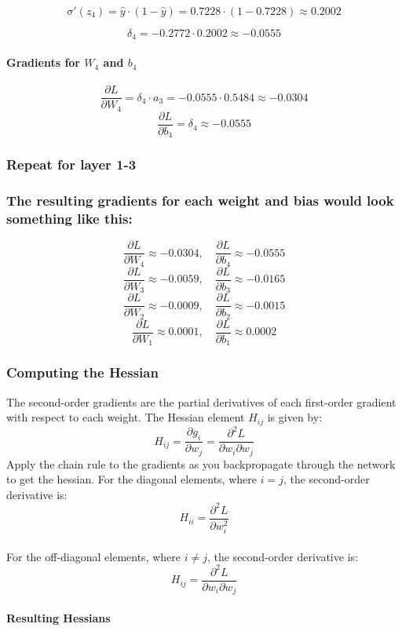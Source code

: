 \documentclass{article}
\begin{document}
\[
\sigma'(z_4) = \hat{y} \cdot (1 - \hat{y}) = 0.7228 \cdot (1 - 0.7228) \approx 0.2002
\]

\[
\delta_4 = -0.2772 \cdot 0.2002 \approx -0.0555
\]

\paragraph{Gradients for \( W_4 \) and \( b_4 \)}
\[
\frac{\partial L}{\partial W_4} = \delta_4 \cdot a_3 = -0.0555 \cdot 0.5484 \approx -0.0304
\]
\[
\frac{\partial L}{\partial b_4} = \delta_4 \approx -0.0555
\]


\subsubsection{Repeat for layer 1-3}

\subsubsection{The resulting gradients for each weight and bias would look something like this:}
\[
\frac{\partial L}{\partial W_4} \approx -0.0304, \quad \frac{\partial L}{\partial b_4} \approx -0.0555
\]
\[
\frac{\partial L}{\partial W_3} \approx -0.0059, \quad \frac{\partial L}{\partial b_3} \approx -0.0165
\]
\[
\frac{\partial L}{\partial W_2} \approx -0.0009, \quad \frac{\partial L}{\partial b_2} \approx -0.0015
\]
\[
\frac{\partial L}{\partial W_1} \approx 0.0001, \quad \frac{\partial L}{\partial b_1} \approx 0.0002
\]

\subsubsection{Computing the Hessian}

The second-order gradients are the partial derivatives of each first-order gradient with respect to each weight. The Hessian element \( H_{ij} \) is given by:
\[
H_{ij} = \frac{\partial g_i}{\partial w_j} = \frac{\partial^2 L}{\partial w_i \partial w_j}
\]
Apply the chain rule to the gradients as you backpropagate through the network to get the hessian. For the diagonal elements, where \( i = j \), the second-order derivative is:
\[
H_{ii} = \frac{\partial^2 L}{\partial w_i^2}
\]
\\
For the off-diagonal elements, where \( i \neq j \), the second-order derivative is:
\[
H_{ij} = \frac{\partial^2 L}{\partial w_i \partial w_j}
\]

\paragraph{Resulting Hessians}
\end{document}
